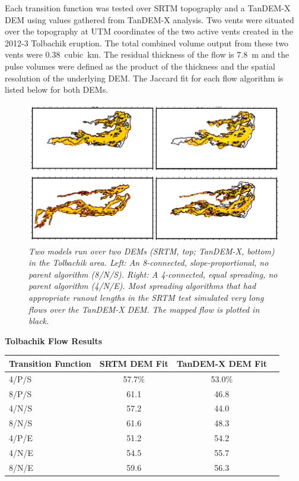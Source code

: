 \documentclass[12pt,letter]{article}
\begin{document}
	Each transition function was tested over SRTM topography and a TanDEM-X DEM using values gathered from TanDEM-X analysis. Two vents were situated over the topography at UTM coordinates of the two active vents created in the 2012-3 Tolbachik eruption. The total combined volume output from these two vents were 0.38~cubic~km. The residual thickness of the flow is 7.8~m and the pulse volumes were defined as the product of the thickness and the spatial resolution of the underlying DEM. The Jaccard fit for each flow algorithm is listed below for both DEMs.
		\begin{figure}[!h]
			\centering
			\includegraphics[width=0.7\linewidth]{figures/tolbachik}
			\caption{\textit{Two models run over two DEMs (SRTM, top; TanDEM-X, bottom) in the Tolbachik area. Left: An 8-connected, slope-proportional, no parent algorithm (8/N/S). Right: A 4-connected, equal spreading, no parent algorithm (4/N/E). Most spreading algorithms that had appropriate runout lengths in the SRTM test simulated very long flows over the TanDEM-X DEM. The mapped flow is plotted in black.}}
			\label{fig:tolbachik}
		\end{figure}
		
		\newpage
		\begin{center}
			\textbf{Tolbachik Flow Results}\\
			\begin{tabular}{l c c c}
				\toprule
				Transition Function&SRTM DEM Fit&TanDEM-X DEM Fit\\
				\midrule
				4/P/S & 57.7\%& 53.0\%\\
				8/P/S & 61.1  & 46.8\\
				4/N/S & 57.2  & 44.0\\
				8/N/S & 61.6  & 48.3\\
				4/P/E & 51.2  & 54.2\\
				4/N/E & 54.5  & 55.7\\
				8/N/E & 59.6  & 56.3\\
				
				\bottomrule
			\end{tabular}
		\end{center}
\end{document}
